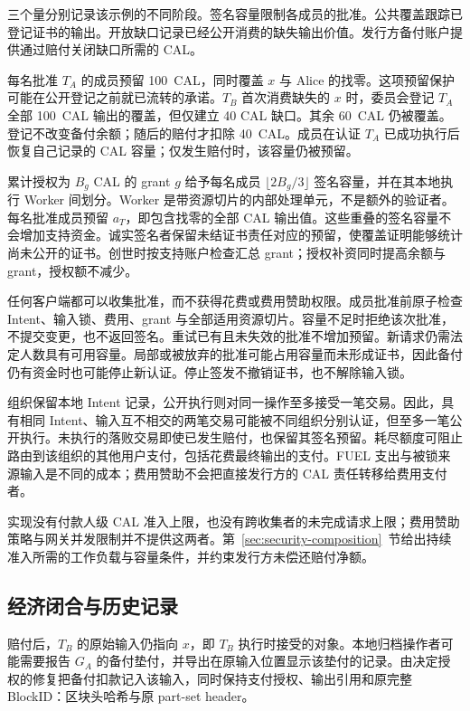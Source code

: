 三个量分别记录该示例的不同阶段。签名容量限制各成员的批准。公共覆盖跟踪已登记证书的输出。开放缺口记录已经公开消费的缺失输出价值。发行方备付账户提供通过赔付关闭缺口所需的 CAL。

每名批准 $T_A$ 的成员预留 100~CAL，同时覆盖 $x$ 与 Alice 的找零。这项预留保护可能在公开登记之前就已流转的承诺。$T_B$ 首次消费缺失的 $x$ 时，委员会登记 $T_A$ 全部 100~CAL 输出的覆盖，但仅建立 40 CAL 缺口。其余 60~CAL 仍被覆盖。登记不改变备付余额；随后的赔付才扣除 40~CAL。成员在认证 $T_A$ 已成功执行后恢复自己记录的 CAL 容量；仅发生赔付时，该容量仍被预留。

累计授权为 $B_g$ CAL 的 grant $g$ 给予每名成员 $\lfloor2B_g/3\rfloor$ 签名容量，并在其本地执行 Worker 间划分。Worker 是带资源切片的内部处理单元，不是额外的验证者。每名批准成员预留 $a_T$，即包含找零的全部 CAL 输出值。这些重叠的签名容量不会增加支持资金。诚实签名者保留未结证书责任对应的预留，使覆盖证明能够统计尚未公开的证书。创世时按支持账户检查汇总 grant；授权补资同时提高余额与 grant，授权额不减少。

任何客户端都可以收集批准，而不获得花费或费用赞助权限。成员批准前原子检查 Intent、输入锁、费用、grant 与全部适用资源切片。容量不足时拒绝该次批准，不提交变更，也不返回签名。重试已有且未失效的批准不增加预留。新请求仍需法定人数具有可用容量。局部或被放弃的批准可能占用容量而未形成证书，因此备付仍有资金时也可能停止新认证。停止签发不撤销证书，也不解除输入锁。

组织保留本地 Intent 记录，公开执行则对同一操作至多接受一笔交易。因此，具有相同 Intent、输入互不相交的两笔交易可能被不同组织分别认证，但至多一笔公开执行。未执行的落败交易即使已发生赔付，也保留其签名预留。耗尽额度可阻止路由到该组织的其他用户支付，包括花费最终输出的支付。FUEL 支出与被锁来源输入是不同的成本；费用赞助不会把直接发行方的 CAL 责任转移给费用支付者。

实现没有付款人级 CAL 准入上限，也没有跨收集者的未完成请求上限；费用赞助策略与网关并发限制并不提供这两者。第~\ref{sec:security-composition}~节给出持续准入所需的工作负载与容量条件，并约束发行方未偿还赔付净额。

\subsection{经济闭合与历史记录}
\label{sec:model-records}

赔付后，$T_B$ 的原始输入仍指向 $x$，即 $T_B$ 执行时接受的对象。本地归档操作者可能需要报告 $G_A$ 的备付垫付，并导出在原输入位置显示该垫付的记录。由决定授权的修复把备付扣款记入该输入，同时保持支付授权、输出引用和原完整 BlockID：区块头哈希与原 part-set header。

